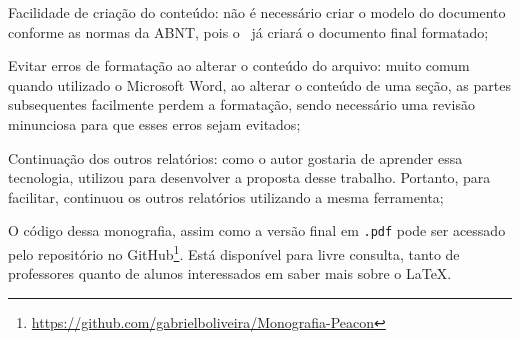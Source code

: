 \begin{alineas}
	\item Facilidade de criação do conteúdo: não é necessário criar o modelo do documento conforme as normas da ABNT, pois o \abnTeX\ já criará o documento final formatado;
	\item Evitar erros de formatação ao alterar o conteúdo do arquivo: muito comum quando utilizado o Microsoft Word, ao alterar o conteúdo de uma seção, as partes subsequentes facilmente perdem a formatação, sendo necessário uma revisão minunciosa para que esses erros sejam evitados;
	\item Continuação dos outros relatórios: como o autor gostaria de aprender essa tecnologia, utilizou para desenvolver a proposta desse trabalho. Portanto, para facilitar, continuou os outros relatórios utilizando a mesma ferramenta;
\end{alineas}

O código dessa monografia, assim como a versão final em \texttt{.pdf} pode ser acessado pelo repositório no GitHub\footnote{\url{https://github.com/gabrielboliveira/Monografia-Peacon}}. Está disponível para livre consulta, tanto de professores quanto de alunos interessados em saber mais sobre o \LaTeX.
